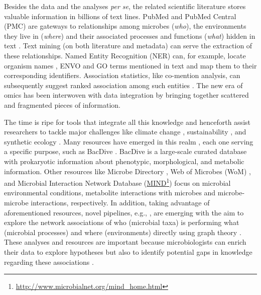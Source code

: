    Besides the data and the analyses \textit{per se}, the related scientific literature stores valuable information in billions of text lines. 
   PubMed \citep{schoch2020ncbi} and PubMed Central (PMC) \citep{roberts2001pubmed} are gateways to relationships among microbes (\textit{who}), the environments they live in (\textit{where}) and their associated processes and functions (\textit{what}) hidden in text \citep{harmston2010papers}. 
   Text mining (on both literature and metadata) can serve the extraction of these relationships. Named Entity Recognition (NER) can, for example, locate organism names \citep{pafilis2013species}, ENVO and GO terms \citep{pafilis2016extract} mentioned in text and map them to their corresponding identifiers. 
   Association statistics, like co-mention analysis, can subsequently suggest ranked association among such entities \citep{von2005string, franceschini2012string}. 
   The new era of omics has been interwoven with data integration \citep{gomez2014data} by bringing together scattered and fragmented pieces of information.

   The time is ripe for tools that integrate all this knowledge and henceforth assist researchers to tackle major challenges like climate change \citep{cavicchioli2019scientists}, 
   sustainability \citep{d2021microbiome}, 
   and synthetic ecology \citep{conde2020synthetic}.
   Many resources have emerged in this realm \citep{baltoumas2021biomolecule}, 
   each one serving a specific purpose, such as BacDive \citep{reimer2019bac}. 
   BacDive is a large-scale curated database with prokaryotic information about phenotypic, morphological, and metabolic information. 
   Other resources like Microbe Directory \citep{shaaban2018microbe}, 
   Web of Microbes (WoM) \citep{kosina2018web}, 
   and Microbial Interaction Network Database (\href{http://www.microbialnet.org/mind_home.html}{MIND}\footnote{
      \href{http://www.microbialnet.org/mind_home.html}{http://www.microbialnet.org/mind\_home.html}
   }) focus on microbial environmental conditions, metabolite interactions with microbes and microbe-microbe interactions, respectively. 
   In addition, taking advantage of aforementioned resources, novel pipelines, e.g., \citep{tang2020tripartite}, are emerging with the aim to explore the network associations of who (microbial taxa) is performing what (microbial processes) and where (environments) directly using graph theory \citep{koutrouli2020guide}. 
   These analyses and resources are important because microbiologists can enrich their data to explore hypotheses but also to identify potential gaps in knowledge regarding these associations \citep{li2021microbial}.

